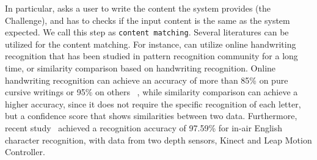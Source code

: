 In particular, \CiT asks a user to write the content the system provides (the Challenge), and \CiT has to checks if the input content is the same as the system expected. We call this step as \texttt{content matching}.
Several literatures can be utilized for the content matching. 
For instance, \CiT can utilize online handwriting recognition that has been studied in pattern recognition community for a long time,  or similarity comparison based on handwriting recognition. Online handwriting recognition can achieve an accuracy of more than 85\% on pure cursive writings or 95\% on others ~\cite{Tappert90, LeeV12Cursive,Madhvanath2012,Plamondon2000Review}, while similarity comparison can achieve a higher accuracy, since it does not require the specific recognition of each letter, but a confidence score that shows similarities between two data. Furthermore, recent study~\cite{ICDAR15:OnlineHandwriting} achieved a recognition accuracy of 97.59\% for in-air English character recognition, with data from two depth sensors, Kinect and Leap Motion Controller. 



